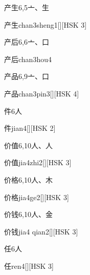 \begin{entry}{产生}{6,5}{⼇、⽣}
  \begin{phonetics}{产生}{chan3sheng1}[][HSK 3]
  \end{phonetics}
\end{entry}

\begin{entry}{产后}{6,6}{⼇、⼝}
  \begin{phonetics}{产后}{chan3hou4}
  \end{phonetics}
\end{entry}

\begin{entry}{产品}{6,9}{⼇、⼝}
  \begin{phonetics}{产品}{chan3pin3}[][HSK 4]
  \end{phonetics}
\end{entry}

\begin{entry}{件}{6}{⼈}
  \begin{phonetics}{件}{jian4}[][HSK 2]
  \end{phonetics}
\end{entry}

\begin{entry}{价值}{6,10}{⼈、⼈}
  \begin{phonetics}{价值}{jia4zhi2}[][HSK 3]
  \end{phonetics}
\end{entry}

\begin{entry}{价格}{6,10}{⼈、⽊}
  \begin{phonetics}{价格}{jia4ge2}[][HSK 3]
  \end{phonetics}
\end{entry}

\begin{entry}{价钱}{6,10}{⼈、⾦}
  \begin{phonetics}{价钱}{jia4 qian2}[][HSK 3]
  \end{phonetics}
\end{entry}

\begin{entry}{任}{6}{⼈}
  \begin{phonetics}{任}{ren4}[][HSK 3]
  \end{phonetics}
\end{entry}

